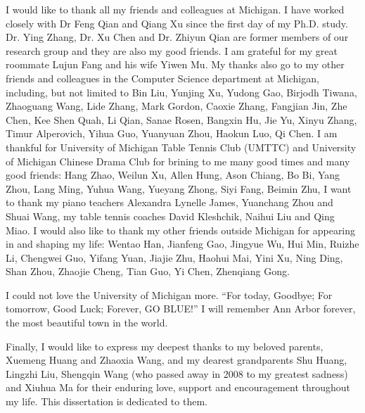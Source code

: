I would like to thank all my friends and colleagues at Michigan. I have worked closely with Dr Feng Qian and Qiang Xu since the first day of my Ph.D. study. Dr. Ying Zhang, Dr. Xu Chen and Dr. Zhiyun Qian are former members of our research group and they are also my good friends. I am grateful for my great roommate Lujun Fang and his wife Yiwen Mu. My thanks also go to my other friends and colleagues in the Computer Science department at Michigan, including, but not limited to Bin Liu, Yunjing Xu, Yudong Gao, Birjodh Tiwana, Zhaoguang Wang, Lide Zhang, Mark Gordon, Caoxie Zhang, Fangjian Jin, Zhe Chen, Kee Shen Quah, Li Qian, Sanae Rosen, Bangxin Hu, Jie Yu, Xinyu Zhang, Timur Alperovich, Yihua Guo, Yuanyuan Zhou, Haokun Luo, Qi Chen. I am thankful for University of Michigan Table Tennis Club (UMTTC) and University of Michigan Chinese Drama Club for brining to me many good times and many good friends: Hang Zhao, Weilun Xu, Allen Hung, Ason Chiang, Bo Bi, Yang Zhou, Lang Ming, Yuhua Wang, Yueyang Zhong, Siyi Fang, Beimin Zhu, \etc I want to thank my piano teachers Alexandra Lynelle James, Yuanchang Zhou and Shuai Wang, my table tennis coaches David Kleshchik, Naihui Liu and Qing Miao. I would also like to thank my other friends outside Michigan for appearing in and shaping my life: Wentao Han, Jianfeng Gao, Jingyue Wu, Hui Min, Ruizhe Li, Chengwei Guo, Yifang Yuan, Jiajie Zhu, Haohui Mai, Yini Xu, Ning Ding, Shan Zhou, Zhaojie Cheng, Tian Guo, Yi Chen, Zhenqiang Gong.

I could not love the University of Michigan more. ``For today, Goodbye; For tomorrow, Good Luck; Forever, GO BLUE!'' I will remember Ann Arbor forever, the most beautiful town in the world.

Finally, I would like to express my deepest thanks to my beloved parents, Xuemeng Huang and Zhaoxia Wang, and my dearest grandparents Shu Huang, Lingzhi Liu, Shengqin Wang (who passed away in 2008 to my greatest sadness) and Xiuhua Ma for their enduring love, support and encouragement throughout my life. This dissertation is dedicated to them.

\label{ACKNOWLEDGEMENTS}
